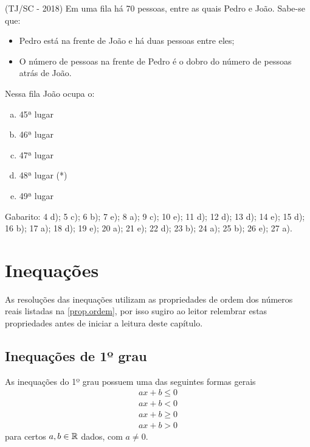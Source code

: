  \begin{exer}
 (TJ/SC - 2018) Em uma fila há 70 pessoas, entre as quais Pedro e João. Sabe-se que:
  \begin{itemize}
   \item Pedro está na frente de João e há duas pessoas entre eles;
   \item O número de pessoas na frente de Pedro é o dobro do número de pessoas atrás de João.
  \end{itemize}
  Nessa fila João ocupa o:
  \begin{enumerate}[a)]
  \item 45ª lugar
  \item 46ª lugar
  \item 47ª lugar
  \item 48ª lugar (*)
  \item 49ª lugar
 \end{enumerate}
 \end{exer}

 Gabarito: 4 d); 5 c); 6 b); 7 e); 8 a); 9 c); 10 e); 11 d); 12 d); 13 d); 14 e); 15 d); 16 b); 17 a); 18 d); 19 e); 20 a); 21 e); 22 d); 23 b); 24 a); 25 b); 26 e); 27 a).

 \chapter{Inequações}

 As resoluções das inequações utilizam as propriedades de ordem dos números reais listadas na \autoref{prop.ordem}, por isso sugiro ao leitor relembrar estas propriedades antes de iniciar a leitura deste capítulo.

 \section{Inequações de 1º grau}
 
 \vskip0.3cm
 \colorbox{azul}{
 \begin{minipage}{0.9\linewidth}
 \begin{center}
  As inequações do 1º grau possuem uma das seguintes formas gerais
 \begin{eqnarray*}
 ax+b \leq 0 \\
 ax+b < 0 \\
 ax+b \geq 0 \\
 ax+b >0 
 \end{eqnarray*}  
 para certos $a, b \in \mathbb{R}$ dados, com $a \neq 0$.
 \end{center}
 \end{minipage}}
 \vskip0.3cm
  
